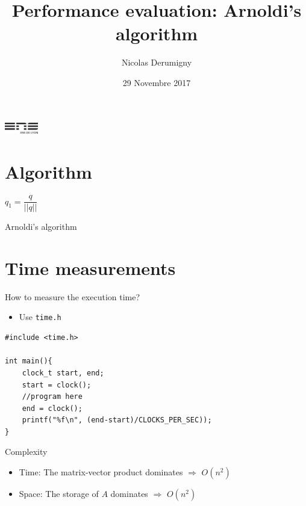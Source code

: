 \documentclass{beamer}
\title[MPNA]{Performance evaluation: Arnoldi's algorithm}
\author[N.D.]{Nicolas Derumigny}
\institute[]{ENS Lyon}
\date{29 Novembre 2017}
\begin{document}
\begin{frame}
	\titlepage
	\begin{center}
	\includegraphics[height=0.5cm]{logoens.pdf}

	\end{center}
\end{frame}

\section{Algorithm}
\begin{frame}
\begin{algorithm}[H]
$q_1 = \dfrac{q}{||q||}$ \\
\caption{Arnoldi's algorithm}
\end{algorithm}
\end{frame}

\section{Time measurements}
\begin{frame}[fragile]{How to measure the execution time?}
\begin{itemize}
\item Use \texttt{time.h}
\end{itemize}
\bigskip
\begin{lstlisting}[frame=single]
#include <time.h>

int main(){
	clock_t start, end;
	start = clock();
	//program here
	end = clock();
	printf("%f\n", (end-start)/CLOCKS_PER_SEC));
}
\end{lstlisting}
\end{frame}

\begin{frame}{Complexity}
\begin{itemize}
\item {Time:} The matrix-vector product dominates $\Rightarrow$ $O(n^2)$
\bigskip
\item {Space:} The storage of $A$ dominates $\Rightarrow$ $O(n^2)$
\end{itemize}
\end{frame}
\end{document}

